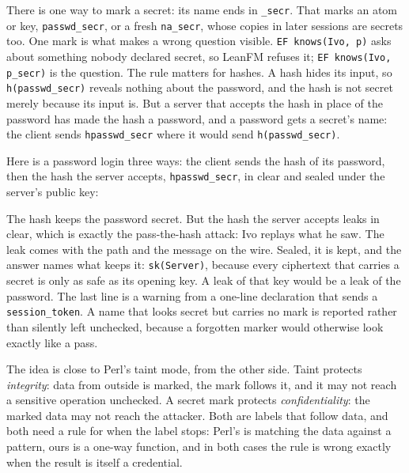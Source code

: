 There is one way to mark a secret: its name ends in \texttt{\_secr}. That marks
an atom or key, \texttt{passwd\_secr}, or a fresh \texttt{na\_secr}, whose copies
in later sessions are secrets too. One mark is what makes a wrong question
visible. \texttt{EF knows(Ivo, p)} asks about something nobody declared secret,
so LeanFM refuses it; \texttt{EF knows(Ivo, p\_secr)} is the question. The rule
matters for hashes. A hash hides its input, so \texttt{h(passwd\_secr)} reveals
nothing about the password, and the hash is not secret merely because its input
is. But a server that accepts the hash in place of the password has made the
hash a password, and a password gets a secret's name: the client sends
\texttt{hpasswd\_secr} where it would send \texttt{h(passwd\_secr)}.

Here is a password login three ways: the client sends the hash of its password,
then the hash the server accepts, \texttt{hpasswd\_secr}, in clear and sealed
under the server's public key:

\begin{center}

\end{center}

\begin{quote}

\end{quote}

The hash keeps the password secret. But the hash the server accepts leaks in
clear, which is exactly the pass-the-hash attack: Ivo replays what he saw. The
leak comes with the path and the message on the wire. Sealed, it is kept, and
the answer names what keeps it: \texttt{sk(Server)}, because every ciphertext that carries a secret is only
as safe as its opening key. A leak of that key would be a leak of the password.
The last line is a warning from a one-line declaration that sends a
\texttt{session\_token}. A name that looks secret but carries no mark is
reported rather than silently left unchecked, because a forgotten marker would
otherwise look exactly like a pass.

The idea is close to Perl's taint mode, from the other side. Taint protects
\emph{integrity}: data from outside is marked, the mark follows it, and it may
not reach a sensitive operation unchecked. A secret mark protects
\emph{confidentiality}: the marked data may not reach the attacker. Both are
labels that follow data, and both need a rule for when the label stops: Perl's
is matching the data against a pattern, ours is a one-way function, and in both
cases the rule is wrong exactly when the result is itself a credential.

